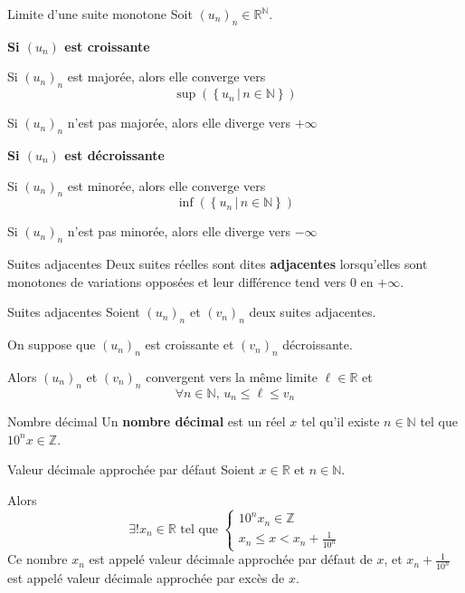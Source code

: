     \begin{theo}{Limite d’une suite monotone}{}
        Soit $(u_n)_n \in \mathbb{R}^{\mathbb{N}}$.

        \textbf{Si $(u_n)$ est croissante} \quad
        \begin{alors}
            \item Si $(u_n)_n$ est majorée, alors elle converge vers 
            \[ \sup(\left\{u_n \, | \, n \in \mathbb{N}\right\}) \]
            \item Si $(u_n)_n$ n’est pas majorée, alors elle diverge vers $+\infty$
        \end{alors} 

        \textbf{Si $(u_n)$ est décroissante} \quad
        \begin{alors}
            \item Si $(u_n)_n$ est minorée, alors elle converge vers
            \[ \inf(\left\{u_n \, | \, n \in \mathbb{N}\right\}) \]
            \item Si $(u_n)_n$ n’est pas minorée, alors elle diverge vers $-\infty$
        \end{alors}
    \end{theo}

    \begin{defi}{Suites adjacentes}{}
        Deux suites réelles sont dites \textbf{adjacentes} lorsqu’elles sont monotones de variations opposées et leur différence tend vers 0 en $+\infty$.
    \end{defi}

    \begin{theo}{Suites adjacentes}{}
        Soient $(u_n)_n$ et $(v_n)_n$ deux suites adjacentes.

        On suppose que $(u_n)_n$ est croissante et $(v_n)_n$ décroissante.
    
        Alors $(u_n)_n$ et $(v_n)_n$ convergent vers la même limite $\ell \in \mathbb{R}$ et 
        \[ \forall n \in \mathbb{N}, \, u_n \leq \ell \leq v_n \]
    \end{theo}

    \begin{defi}{Nombre décimal}{}
        Un \textbf{nombre décimal} est un réel $x$ tel qu’il existe $n \in \mathbb{N}$ tel que $10^n x \in \mathbb{Z}$.
    \end{defi}

    \begin{prop}{Valeur décimale approchée par défaut}{}
        Soient $x \in \mathbb{R}$ et $n \in \mathbb{N}$.

        Alors \[ \exists ! x_n \in \mathbb{R} \text{ tel que } \left\{ \begin{array}{ll}
            10^n x_n \in \mathbb{Z} \\
            x_n \leq x < x_n + \frac{1}{10^n}
        \end{array} \right. \]
        Ce nombre $x_n$ est appelé valeur décimale approchée par défaut de $x$, et $x_n + \frac{1}{10^n}$ est appelé valeur décimale approchée par excès de $x$.
    \end{prop}

